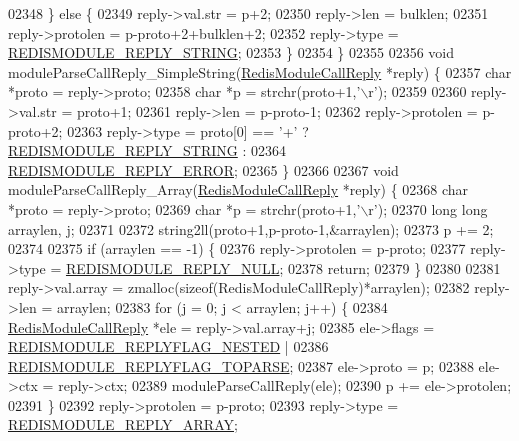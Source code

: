 \begin{DoxyCode}
{{{02348     \} \textcolor{keywordflow}{else} \{
02349         reply->val.str = p+2;
02350         reply->len = bulklen;
02351         reply->protolen = p-proto+2+bulklen+2;
02352         reply->type = \hyperlink{redismodule_8h_abc8a4584f9085b55692994244a26012b}{REDISMODULE\_REPLY\_STRING};
02353     \}
02354 \}
02355 
02356 \textcolor{keywordtype}{void} moduleParseCallReply\_SimpleString(\hyperlink{structRedisModuleCallReply}{RedisModuleCallReply} *reply) \{
02357     \textcolor{keywordtype}{char} *proto = reply->proto;
02358     \textcolor{keywordtype}{char} *p = strchr(proto+1,\textcolor{stringliteral}{'\(\backslash\)r'});
02359 
02360     reply->val.str = proto+1;
02361     reply->len = p-proto-1;
02362     reply->protolen = p-proto+2;
02363     reply->type = proto[0] == \textcolor{stringliteral}{'+'} ? \hyperlink{redismodule_8h_abc8a4584f9085b55692994244a26012b}{REDISMODULE\_REPLY\_STRING} :
02364                                     \hyperlink{redismodule_8h_ae70c78e91f22b2ff98795babccac44c9}{REDISMODULE\_REPLY\_ERROR};
02365 \}
02366 
02367 \textcolor{keywordtype}{void} moduleParseCallReply\_Array(\hyperlink{structRedisModuleCallReply}{RedisModuleCallReply} *reply) \{
02368     \textcolor{keywordtype}{char} *proto = reply->proto;
02369     \textcolor{keywordtype}{char} *p = strchr(proto+1,\textcolor{stringliteral}{'\(\backslash\)r'});
02370     \textcolor{keywordtype}{long} \textcolor{keywordtype}{long} arraylen, j;
02371 
02372     string2ll(proto+1,p-proto-1,&arraylen);
02373     p += 2;
02374 
02375     \textcolor{keywordflow}{if} (arraylen == -1) \{
02376         reply->protolen = p-proto;
02377         reply->type = \hyperlink{redismodule_8h_a5f14ab4822e5911f669c942f0fb95f7f}{REDISMODULE\_REPLY\_NULL};
02378         \textcolor{keywordflow}{return};
02379     \}
02380 
02381     reply->val.array = zmalloc(\textcolor{keyword}{sizeof}(RedisModuleCallReply)*arraylen);
02382     reply->len = arraylen;
02383     \textcolor{keywordflow}{for} (j = 0; j < arraylen; j++) \{
02384         \hyperlink{structRedisModuleCallReply}{RedisModuleCallReply} *ele = reply->val.array+j;
02385         ele->flags = \hyperlink{module_8c_a1605682f825f95f3de0c5bd149ecdff5}{REDISMODULE\_REPLYFLAG\_NESTED} |
02386                      \hyperlink{module_8c_a86d2a6b1f34cb5c7d5b69e4646ae0a7a}{REDISMODULE\_REPLYFLAG\_TOPARSE};
02387         ele->proto = p;
02388         ele->ctx = reply->ctx;
02389         moduleParseCallReply(ele);
02390         p += ele->protolen;
02391     \}
02392     reply->protolen = p-proto;
02393     reply->type = \hyperlink{redismodule_8h_a2adb9d56c9d950784c3397cbe3f5d6af}{REDISMODULE\_REPLY\_ARRAY};
}}}
\end{DoxyCode}
